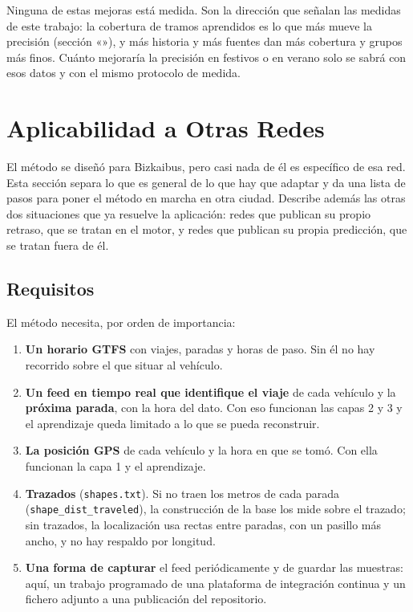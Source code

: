 \noindent Ninguna de estas mejoras está medida. Son la dirección que señalan las medidas de este trabajo: la cobertura
de tramos aprendidos es lo que más mueve la precisión (sección «»), y más historia y más fuentes
dan más cobertura y grupos más finos. Cuánto mejoraría la precisión en festivos o en verano solo se sabrá con esos
datos y con el mismo protocolo de medida.

\section{Aplicabilidad a Otras Redes}
\label{sec:aplicabilidad}

El método se diseñó para Bizkaibus, pero casi nada de él es específico de esa red. Esta sección separa lo que es
general de lo que hay que adaptar y da una lista de pasos para poner el método en marcha en otra ciudad. Describe
además las otras dos situaciones que ya resuelve la aplicación: redes que publican su propio retraso, que se tratan en
el motor, y redes que publican su propia predicción, que se tratan fuera de él.

\subsection{Requisitos}
\label{sec:requisitos}

El método necesita, por orden de importancia:

\begin{enumerate}
  \item \textbf{Un horario GTFS} con viajes, paradas y horas de paso. Sin él no hay recorrido sobre el que situar al
        vehículo.
  \item \textbf{Un feed en tiempo real que identifique el viaje} de cada vehículo y la \textbf{próxima parada}, con la
        hora del dato. Con eso funcionan las capas 2 y 3 y el aprendizaje queda limitado a lo que se pueda reconstruir.
  \item \textbf{La posición GPS} de cada vehículo y la hora en que se tomó. Con ella funcionan la capa 1 y el
        aprendizaje.
  \item \textbf{Trazados} (\texttt{shapes.txt}). Si no traen los metros de cada parada
        (\texttt{shape\_dist\_traveled}), la construcción de la base los mide sobre el trazado; sin trazados, la
        localización usa rectas entre paradas, con un pasillo más ancho, y no hay respaldo por longitud.
  \item \textbf{Una forma de capturar} el feed periódicamente y de guardar las muestras: aquí, un trabajo
        programado de una plataforma de integración continua y un fichero adjunto a una publicación del repositorio.
\end{enumerate}

